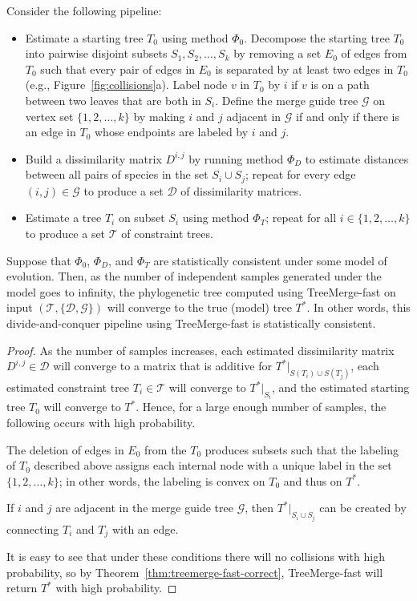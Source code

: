 \begin{theorem}
\label{thm:treemerge-fast-sc}
Consider the following pipeline:
\begin{itemize}
	\item 
	Estimate a starting tree $T_0$ using method $\Phi_0$. 
	Decompose the starting tree $T_0$ into pairwise disjoint subsets $S_1, S_2, \ldots, S_k$ by removing a set $E_0$ of edges from $T_0$ such that every pair of edges in $E_0$ is separated by at least two edges in $T_0$ (e.g., Figure~\ref{fig:collisions}a). 
	Label node $v$ in $T_0$ by $i$ if $v$ is on a path between two leaves that are both in $S_i$.
	Define the merge guide tree $\mathcal{G}$ on vertex set $\{ 1, 2, \dots, k \}$ by making $i$ and $j$ adjacent in $\mathcal{G}$ if and only if there is an edge in $T_0$ whose endpoints are labeled by $i$ and $j$.
	\item Build a dissimilarity matrix $D^{i,j}$ by running method $\Phi_D$ to estimate distances between all pairs of species in the set $S_i \cup S_j$; repeat for every edge $(i, j) \in \mathcal{G}$ to produce a set $\mathcal{D}$ of dissimilarity matrices.
	\item Estimate a tree $T_i$ on subset $S_i$ using method $\Phi_T$; repeat for all $i \in \{1, 2, \dots, k\}$ to produce a set $\mathcal{T}$ of constraint trees.
\end{itemize}
Suppose that $\Phi_0$, $\Phi_D$, and $\Phi_T$ are statistically consistent under some model of evolution.
Then, as the number of independent samples generated under the model goes to infinity, the phylogenetic tree computed using TreeMerge-fast on input $(\mathcal{T},\{\mathcal{D},\mathcal{G}\})$ will converge to the true (model) tree $T^*$.
In other words, this divide-and-conquer pipeline using TreeMerge-fast is statistically consistent.
\end{theorem}
\begin{proof}
As the number of samples increases, each estimated dissimilarity matrix $D^{i,j} \in \mathcal{D}$ will converge to a matrix that is additive for $T^*|_{S(T_i) \cup S(T_j)}$, each estimated constraint tree $T_i \in \mathcal{T}$ will converge to $T^*|_{S_i}$,  and the estimated starting tree $T_0$ will converge to $T^*$.
Hence, for a large enough number of samples, the following occurs with high probability.
\begin{enumerate*}[label=(\roman*)]
	\item The deletion of edges in $E_0$ from the $T_0$ produces subsets such that the labeling of $T_0$ described above assigns each internal node with a unique label in the set $\{1, 2, \dots, k\}$; in other words, the labeling is convex on $T_0$ and thus on $T^*$.
	\item If $i$ and $j$ are adjacent in the merge guide tree $\mathcal{G}$, then $T^*|_{S_i \cup S_j}$ can be created by connecting $T_i$ and $T_j$ with an edge.
\end{enumerate*}
It is easy to see that under these conditions there will no collisions with high probability, so by Theorem~\ref{thm:treemerge-fast-correct}, TreeMerge-fast will return $T^*$ with high probability.
\end{proof}

